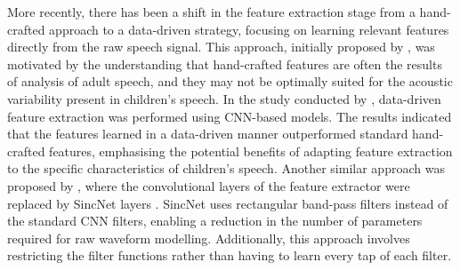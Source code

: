 More recently, there has been a shift in the feature extraction stage from a hand-crafted approach to a data-driven strategy, focusing on learning relevant features directly from the raw speech signal. This approach, initially proposed by \cite{feat_ext_from_raw}, was motivated by the understanding that hand-crafted features are often the results of analysis of adult speech, and they may not be optimally suited for the acoustic variability present in children's speech. In the study conducted by \cite{feat_ext_from_raw}, data-driven feature extraction was performed using \ac{CNN}-based models. The results indicated that the features learned in a data-driven manner outperformed standard hand-crafted features, emphasising the potential benefits of adapting feature extraction to the specific characteristics of children's speech. Another similar approach was proposed by \cite{sincnet_adapt}, where the convolutional layers of the feature extractor were replaced by SincNet layers \cite{Sincnet}. SincNet uses rectangular band-pass filters instead of the standard \ac{CNN} filters, enabling a reduction in the number of parameters required for raw waveform modelling. Additionally, this approach involves restricting the filter functions rather than having to learn every tap of each filter. 


